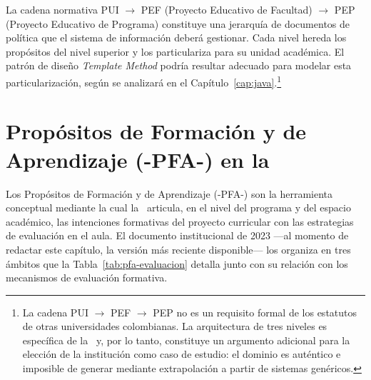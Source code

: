 La cadena normativa PUI $\rightarrow$ PEF (Proyecto Educativo de Facultad)
$\rightarrow$ PEP (Proyecto Educativo de Programa) constituye una jerarquía
de documentos de política que el sistema de información deberá gestionar.
Cada nivel hereda los propósitos del nivel superior y los particulariza
para su unidad académica. El patrón de diseño \textit{Template Method}
podría resultar adecuado para modelar esta particularización, según se
analizará en el Capítulo~\ref{cap:java}.\footnote{%
  La cadena PUI $\rightarrow$ PEF $\rightarrow$ PEP no es un requisito
  formal de los estatutos de otras universidades colombianas. La arquitectura
  de tres niveles es específica de la \ud\ y, por lo tanto, constituye
  un argumento adicional para la elección de la institución como caso de
  estudio: el dominio es auténtico e imposible de generar mediante extrapolación
  a partir de sistemas genéricos.}

\section{Propósitos de Formación y de Aprendizaje (-PFA-) en la \ud}
\label{sec:pfa}

Los Propósitos de Formación y de Aprendizaje (-PFA-) son la herramienta
conceptual mediante la cual la \ud\ articula, en el nivel del programa y del
espacio académico, las intenciones formativas del proyecto curricular con las
estrategias de evaluación en el aula. El documento institucional de 2023
---al momento de redactar este capítulo, la versión más reciente disponible---
los organiza en tres ámbitos que la Tabla~\ref{tab:pfa-evaluacion} detalla
junto con su relación con los mecanismos de evaluación formativa.

